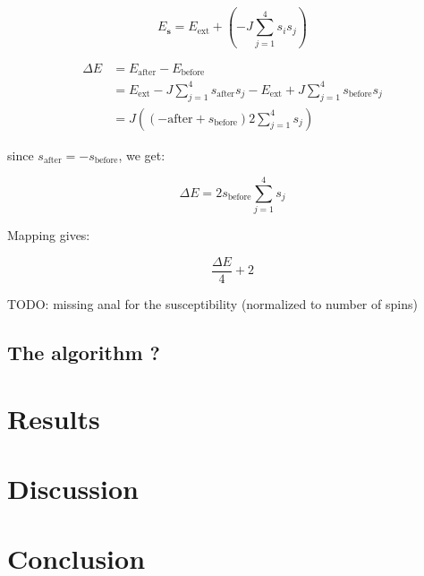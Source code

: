 \documentclass[english,notitlepage,reprint,nofootinbib]{revtex4-1}  %
\begin{document}
\begin{equation}
    E_{\mathbf{s}} = E_{\text{ext}} + \left( -J \sum\limits_{j = 1}^4 s_i s_j \right)
\end{equation}

\begin{align*}
    \Delta E &= E_{\text{after}} - E_{\text{before}} \\
    &= E_{\text{ext}} - J \sum\limits_{j = 1}^4 s_{\text{after}} s_j - E_{\text{ext}} + J \sum\limits_{j = 1}^4 s_{\text{before}} s_j \\
    &= J \left( \left( - \text{after} + s_{\text{before}} \right) 2 \sum\limits_{j = 1}^4 s_j \right)
\end{align*}

since $s_{\text{after}} = - s_{\text{before}}$, we get:

\begin{equation}
    \Delta E = 2 s_{\text{before}} \sum\limits_{j = 1}^4 s_j
\end{equation}

Mapping gives:

\begin{equation}
    \frac{\Delta E}{4} + 2
\end{equation}

TODO: missing anal for the susceptibility (normalized to number of spins)


\subsection*{The algorithm ?}

\section{Results}\label{sec:results}

\section{Discussion}\label{sec:discussion}
%

 
\section{Conclusion}\label{sec:conclusion}
\end{document}
